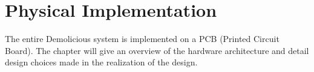 \documentclass[../main/report.tex]{subfiles}
\begin{document}
\chapter{Physical Implementation}
\label{sec:pcb}

The entire Demolicious system is implemented on a PCB (Printed Circuit Board).
The chapter will give an overview of the hardware architecture
and detail design choices made in the realization of the design.














\end{document}
